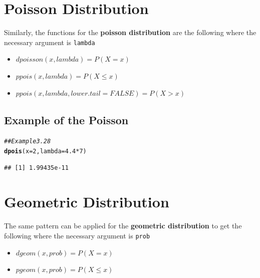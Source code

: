 \documentclass{report}\usepackage[]{graphicx}\usepackage[]{color}
\makeatletter
\newcommand{\hlnum}[1]{\textcolor[rgb]{0.686,0.059,0.569}{#1}}%
\newcommand{\hlcom}[1]{\textcolor[rgb]{0.678,0.584,0.686}{\textit{#1}}}%
\newcommand{\hlopt}[1]{\textcolor[rgb]{0,0,0}{#1}}%
\newcommand{\hlstd}[1]{\textcolor[rgb]{0.345,0.345,0.345}{#1}}%
\newcommand{\hlkwc}[1]{\textcolor[rgb]{0.333,0.667,0.333}{#1}}%
\newcommand{\hlkwd}[1]{\textcolor[rgb]{0.737,0.353,0.396}{\textbf{#1}}}%
\newenvironment{kframe}{%
 \def\at@end@of@kframe{}%
 \ifinner\ifhmode%
  \def\at@end@of@kframe{\end{minipage}}%
  \begin{minipage}{\columnwidth}%
 \fi\fi%
 \def\FrameCommand##1{\hskip\@totalleftmargin \hskip-\fboxsep
 \colorbox{shadecolor}{##1}\hskip-\fboxsep
     \hskip-\linewidth \hskip-\@totalleftmargin \hskip\columnwidth}%
 \MakeFramed {\advance\hsize-\width
   \@totalleftmargin\z@ \linewidth\hsize
   \@setminipage}}%
 {\par\unskip\endMakeFramed%
 \at@end@of@kframe}
\newenvironment{knitrout}{}{} %
\makeatother
\begin{document}
\section{Poisson Distribution}
Similarly, the functions for the \textbf{poisson distribution} are the following where the necessary argument is \texttt{lambda}
\begin{itemize} 
\item $dpoisson(x, lambda) = P(X = x)$ 
\item $ppois(x, lambda) = P(X \leq x)$ 
\item $ppois(x, lambda, lower.tail = FALSE) = P(X > x)$ 
\end{itemize}

\subsection{Example of the Poisson}
\begin{knitrout}
\color{fgcolor}\begin{kframe}
\begin{alltt}
\hlcom{## Example 3.28 }
\hlkwd{dpois}\hlstd{(}\hlkwc{x} \hlstd{=} \hlnum{2}\hlstd{,} \hlkwc{lambda} \hlstd{=} \hlnum{4.4}\hlopt{*}\hlnum{7}\hlstd{)}
\end{alltt}
\begin{verbatim}
## [1] 1.99435e-11
\end{verbatim}
\end{kframe}
\end{knitrout}



\section{Geometric Distribution}
The same pattern can be applied for the \textbf{geometric distribution} to get the following where the necessary argument is \texttt{prob}
\begin{itemize} 
\item $dgeom(x,prob) = P(X = x)$ 
\item $pgeom(x,prob) = P(X \leq x)$
\end{itemize}
\end{document}
